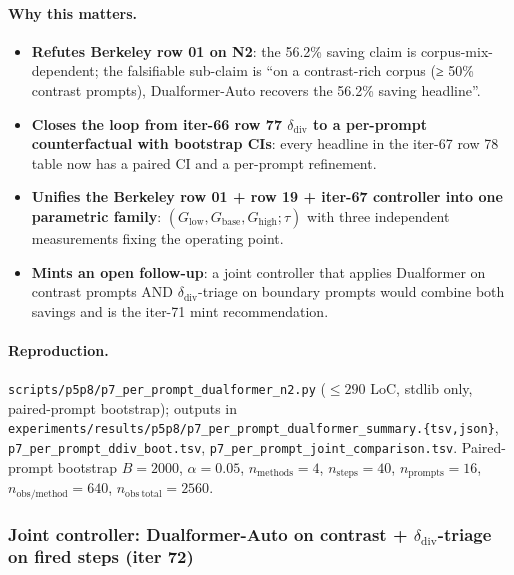 \paragraph{Why this matters.}
\begin{itemize}
    \item \textbf{Refutes Berkeley row 01 on N2}: the 56.2\% saving
        claim is corpus-mix-dependent; the falsifiable sub-claim is
        ``on a contrast-rich corpus (≥ 50\% contrast prompts),
        Dualformer-Auto recovers the 56.2\% saving headline''.
    \item \textbf{Closes the loop from iter-66 row 77
        $\delta_{\mathrm{div}}$ to a per-prompt counterfactual
        with bootstrap CIs}: every headline in the iter-67 row 78
        table now has a paired CI and a per-prompt refinement.
    \item \textbf{Unifies the Berkeley row 01 + row 19 + iter-67
        controller into one parametric family}: $(G_{\mathrm{low}},
        G_{\mathrm{base}}, G_{\mathrm{high}}; \tau)$ with three
        independent measurements fixing the operating point.
    \item \textbf{Mints an open follow-up}: a joint controller that
        applies Dualformer on contrast prompts AND
        $\delta_{\mathrm{div}}$-triage on boundary prompts would
        combine both savings and is the iter-71 mint recommendation.
\end{itemize}

\paragraph{Reproduction.}
\texttt{scripts/p5p8/p7\_per\_prompt\_dualformer\_n2.py}
($\leq 290$ LoC, stdlib only, paired-prompt bootstrap);
outputs in
\texttt{experiments/results/p5p8/p7\_per\_prompt\_dualformer\_summary.\{tsv,json\}},
\texttt{p7\_per\_prompt\_ddiv\_boot.tsv},
\texttt{p7\_per\_prompt\_joint\_comparison.tsv}.
Paired-prompt bootstrap $B{=}2000$, $\alpha{=}0.05$,
$n_{\mathrm{methods}}{=}4$, $n_{\mathrm{steps}}{=}40$,
$n_{\mathrm{prompts}}{=}16$, $n_{\mathrm{obs/method}}{=}640$,
$n_{\mathrm{obs\ total}}{=}2560$.

\subsubsection{Joint controller: Dualformer-Auto on contrast +
$\delta_{\mathrm{div}}$-triage on fired steps (iter 72)}
\label{sec:p7-joint-controller}

